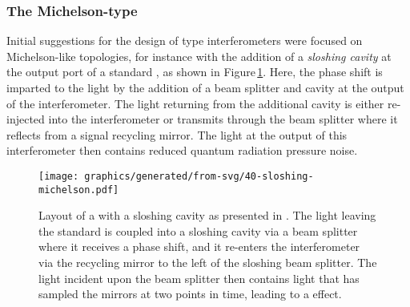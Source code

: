 \subsubsection{The Michelson-type \SM{}}
Initial suggestions for the design of \SM{} type interferometers were focused on Michelson-like topologies, for instance with the addition of a \emph{sloshing cavity} \cite{Braginsky2000, Purdue2002} at the output port of a standard \FPMI{}, as shown in Figure\,\ref{fig:sloshing-michelson}. Here, the phase shift is imparted to the light by the addition of a beam splitter and cavity at the output of the interferometer. The light returning from the additional cavity is either re-injected into the interferometer or transmits through the beam splitter where it reflects from a signal recycling mirror. The light at the output of this interferometer then contains reduced quantum radiation pressure noise.

\begin{figure}
  \centering
  \texttt{[image: graphics/generated/from-svg/40-sloshing-michelson.pdf]}
  \caption[Layout of a \MI{} with a sloshing cavity]{\label{fig:sloshing-michelson}Layout of a \MI{} with a sloshing cavity as presented in \cite{Purdue2002}. The light leaving the standard \MI{} is coupled into a sloshing cavity via a beam splitter where it receives a phase shift, and it re-enters the interferometer via the recycling mirror to the left of the sloshing beam splitter. The light incident upon the beam splitter then contains light that has sampled the mirrors at two points in time, leading to a \SM{} effect.}
\end{figure}

